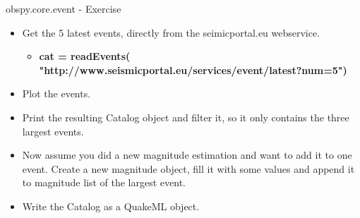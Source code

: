 \begin{frame}{obspy.core.event - Exercise}
    \begin{itemize}
        \item Get the 5 latest events, directly from the seimicportal.eu webservice.
            \begin{itemize}
                \item \footnotesize{\textbf{cat = readEvents(\\
                 "http://www.seismicportal.eu/services/event/latest?num=5")}}
            \end{itemize}
        \item Plot the events.
        \item Print the resulting Catalog object and filter it, so it only contains the three largest events.
        \item Now assume you did a new magnitude estimation and want to add it
            to one event. Create a new magnitude object, fill it with some
            values and append it to magnitude list of the largest event.
        \item Write the Catalog as a QuakeML object.
    \end{itemize}
\end{frame}




